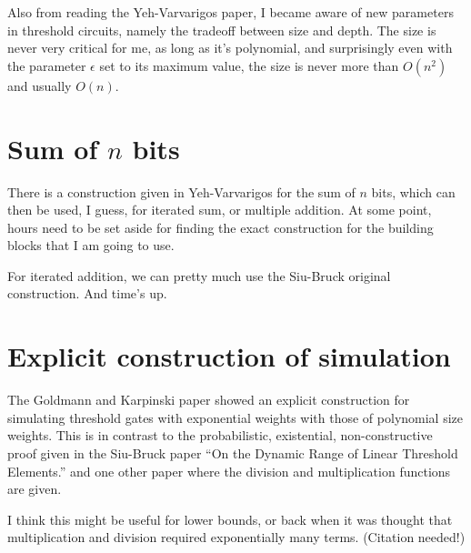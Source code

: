 \documentclass{article}
\begin{document}
Also from reading the Yeh-Varvarigos paper, I became aware of new parameters
in threshold circuits, namely the tradeoff between size and depth. The
size is never very critical for me, as long as it's polynomial, and 
surprisingly even with the parameter $\epsilon$ set to its maximum value,
the size is never more than $O(n^2)$ and usually $O(n)$.

\section{Sum of $n$ bits}

There is a construction given in Yeh-Varvarigos for the sum of $n$ bits,
which can then be used, I guess, for iterated sum, or multiple addition.
At some point, hours need to be set aside for finding the exact
construction for the building blocks that I am going to use.

For iterated addition, we can pretty much use the Siu-Bruck original
construction. And time's up.

\section{Explicit construction of simulation}

The Goldmann and Karpinski paper showed an explicit construction for
simulating threshold gates with exponential weights with those of
polynomial size weights. This is in contrast to the probabilistic,
existential, non-constructive proof given in the Siu-Bruck
paper ``On the Dynamic Range of Linear Threshold Elements.'' and
one other paper where the division and multiplication functions are
given.

I think this might be useful for lower bounds, or back when it was thought
that multiplication and division required exponentially many terms.
(Citation needed!)
\end{document}
